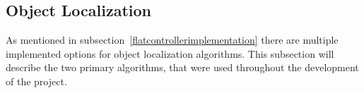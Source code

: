 \subsection{Object Localization}\label{solution:ObjectLocalization}
As mentioned in subsection~\ref{flatcontrollerimplementation} there are multiple implemented options for object localization algorithms.
This subsection will describe the two primary algorithms, that were used throughout the development of the project.


